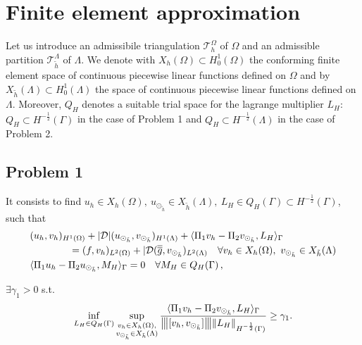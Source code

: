 \section{Finite element approximation}
Let us introduce an admissibile triangulation $\mathcal{T}^{\Omega}_h$ of $\Omega$ and an admissible partition $\mathcal{T}^{\Lambda}_{\tilde{h}}$ of $\Lambda$. We denote with $X_h(\Omega)\subset H^1_0(\Omega)$ the conforming finite element space of continuous piecewise linear functions defined on $\Omega$ and by $X_{\tilde{h}}(\Lambda)\subset H^1_0(\Lambda)$ the space of continuous piecewise linear functions defined on $\Lambda$. Moreover, $Q_H$ denotes a suitable trial space for the lagrange multiplier $L_H$: $Q_H \subset H^{-\frac12}(\Gamma )$ in the case of Problem 1 and $Q_H \subset H^{-\frac12}(\Lambda)$ in the case of Problem 2. 

\subsection{Problem 1}

\def\udh{u_{\odot_{\tilde{h}}}}
\def\vdh{v_{\odot_{\tilde{h}}}}

It consists to find $u_h \in X_h(\Omega) ,\ \udh \in X_{\tilde{h}}(\Lambda) , \ L_H \in Q_H(\Gamma) \subset H^{-\frac12}(\Gamma )$, such that
\begin{subequations}\label{eq:red_dirneu}
\begin{align}
&(u_h,v_h)_{H^1(\Omega)} + |{\cal D}| (\udh,\vdh)_{H^1(\Lambda)} 
+ \langle \Pi_1 v_h  - \Pi_2 \vdh, L_H \rangle_\Gamma 
\\
\nonumber
&\qquad\qquad= (f,v_h)_{L^2(\Omega)} + |{\cal D}(\avrd{g},\vdh)_{L^2(\Lambda)}
\quad \forall v_h \in X_h(\Omega), \ \vdh \in X_{\tilde{h}}(\Lambda)
\\
&   \langle \Pi_1 u_h - \Pi_2 \udh , M_H \rangle_\Gamma = 0
\quad \forall M_H \in Q_H(\Gamma)\,,
\end{align}
\end{subequations}

\begin{theorem}
$\exists \gamma _1 >0$ s.t.
\begin{equation}\label{inf_sup_discrete_prob1}
\inf_{L_H \in Q_H(\Gamma)} 
\sup_{\substack{v_h \in X_h(\Omega),\\ \vdh \in X_{\tilde{h}}(\Lambda)}} \frac{ \langle \Pi_1 v_h - \Pi_2 \vdh, L_H \rangle _{\Gamma}} {\vertiii{[v_h, \vdh]} \|L_H\|_{H^{-\frac 12 }(\Gamma)}} 
\geq \gamma _1. 
\end{equation}
\end{theorem}

